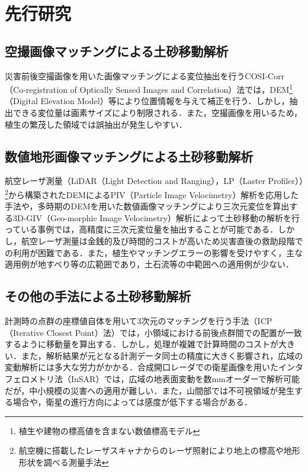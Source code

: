   \section{先行研究}
    \subsection*{空撮画像マッチングによる土砂移動解析}
      災害前後空撮画像を用いた画像マッチングによる変位抽出を行うCOSI-Corr（Co-registration of Optically Sensed Images and Correlation）法\cite{土砂移動解析1}では，DEM\footnote{植生や建物の標高値を含まない数値標高モデル}（Digital Elevation Model）等により位置情報を与えて補正を行う．しかし，抽出できる変位量は画素サイズにより制限される．また，空撮画像を用いるため，植生の繁茂した領域では誤抽出が発生しやすい．


    \subsection*{数値地形画像マッチングによる土砂移動解析}
      航空レーザ測量（LiDAR（Light Detection and Ranging），LP（Laster Profiler））\footnote{航空機に搭載したレーザスキャナからのレーザ照射により地上の標高や地形形状を調べる測量手法}から構築されたDEMによるPIV（Particle Image Velocimetry）解析\cite{土砂移動解析2}を応用した手法や，多時期のDEMを用いた数値画像マッチングにより三次元変位を算出する3D-GIV（Geo-morphic Image Velocimetry）解析\cite{土砂移動解析3, 土砂移動解析4, 土砂移動解析5}によって土砂移動の解析を行っている事例では，高精度に三次元変位量を抽出することが可能である．しかし，航空レーザ測量は金銭的及び時間的コストが高いため災害直後の救助段階での利用が困難である．また，植生やマッチングエラーの影響を受けやすく，主な適用例が地すべり等の広範囲であり，土石流等の中範囲への適用例が少ない．
      

    \subsection*{その他の手法による土砂移動解析}
      計測時の点群の座標値自体を用いて3次元のマッチングを行う手法（ICP（Iterative Closest Point）法）\cite{土砂移動解析5}では，小領域における前後点群間での配置が一致するように移動量を算出する．しかし，処理が複雑で計算時間のコストが大きい．また，解析結果が元となる計測データ同士の精度に大きく影響され，広域の変動解析には多大な労力がかかる．合成開口レーダでの衛星画像を用いたインタフェロメトリ法（InSAR）\cite{土砂移動解析6}では，広域の地表面変動を数mmオーダーで解析可能だが，中小規模の災害への適用が難しい．また，山間部では不可視領域が発生する場合や，衛星の進行方向によっては感度が低下する場合がある．


